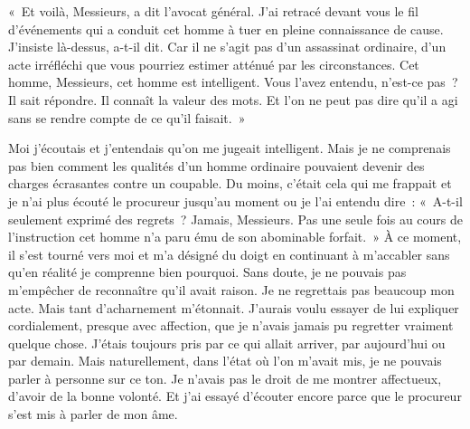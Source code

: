 \documentclass[french,twoside]{book} %
\begin{document}
« Et voilà, Messieurs, a dit l’avocat général. J'ai retracé devant vous le fil d’événements qui a conduit cet homme à tuer en pleine connaissance de cause. J'insiste là-dessus, a-t-il dit. Car il ne s’agit pas d’un assassinat ordinaire, d’un acte irréfléchi que vous pourriez estimer atténué par les circonstances. Cet homme, Messieurs, cet homme est intelligent. Vous l’avez entendu, n’est-ce pas ? Il sait répondre. Il connaît la valeur des mots. Et l’on ne peut pas dire qu’il a agi sans se rendre compte de ce qu’il faisait. »\par
Moi j’écoutais et j’entendais qu’on me jugeait intelligent. Mais je ne comprenais pas bien comment les qualités d’un homme ordinaire pouvaient devenir des charges écrasantes contre un coupable. Du moins, c’était cela qui me frappait et je n’ai plus écouté le procureur jusqu’au moment ou je l’ai entendu dire : « A-t-il seulement exprimé des regrets ? Jamais, Messieurs. Pas une seule fois au cours de l’instruction cet homme n’a paru ému de son abominable forfait. » À ce moment, il s’est tourné vers moi et m’a désigné du doigt en continuant à m’accabler sans qu’en réalité je comprenne bien pourquoi. Sans doute, je ne pouvais pas m’empêcher de reconnaître qu’il avait raison. Je ne regrettais pas beaucoup mon acte. Mais tant d’acharnement m’étonnait. J'aurais voulu essayer de lui expliquer cordialement, presque avec affection, que je n’avais jamais pu regretter vraiment quelque chose. J'étais toujours pris par ce qui allait arriver, par aujourd’hui ou par demain. Mais naturellement, dans l’état où l’on m’avait mis, je ne pouvais parler à personne sur ce ton. Je n’avais pas le droit de me montrer affectueux, d’avoir de la bonne volonté. Et j’ai essayé d’écouter encore parce que le procureur s’est mis à parler de mon âme.\par
\end{document}

